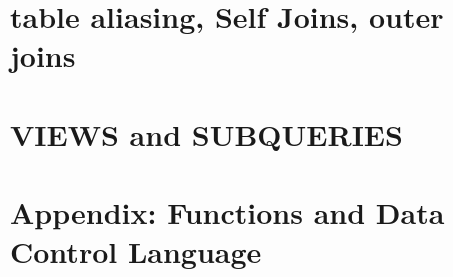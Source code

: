 \documentclass{report}
\begin{document}
\begin{flushleft}
{\chapter{table aliasing, Self Joins, outer joins}


\chapter{VIEWS and SUBQUERIES}


\chapter{Appendix: Functions and Data Control Language}


} %
\end{flushleft}
\end{document}
